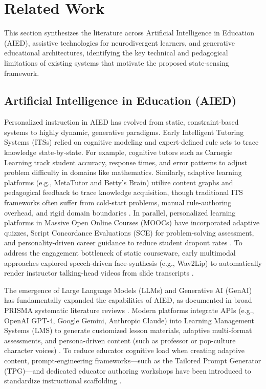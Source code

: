 \documentclass[final,5p,times,twocolumn,authoryear]{elsarticle}
\begin{document}
\section{Related Work}
\label{sec:related_work}

This section synthesizes the literature across Artificial Intelligence in Education (AIED), assistive technologies for neurodivergent learners, and generative educational architectures, identifying the key technical and pedagogical limitations of existing systems that motivate the proposed state-sensing framework.

\subsection{Artificial Intelligence in Education (AIED)}
\label{subsec:related_aied}

Personalized instruction in AIED has evolved from static, constraint-based systems to highly dynamic, generative paradigms. Early Intelligent Tutoring Systems (ITSs) relied on cognitive modeling and expert-defined rule sets to trace knowledge state-by-state. For example, cognitive tutors such as Carnegie Learning \cite{8} track student accuracy, response times, and error patterns to adjust problem difficulty in domains like mathematics. Similarly, adaptive learning platforms (e.g., MetaTutor and Betty's Brain) \cite{2} utilize content graphs and pedagogical feedback to trace knowledge acquisition, though traditional ITS frameworks often suffer from cold-start problems, manual rule-authoring overhead, and rigid domain boundaries \cite{3, 20}. In parallel, personalized learning platforms in Massive Open Online Courses (MOOCs) have incorporated adaptive quizzes, Script Concordance Evaluations (SCE) for problem-solving assessment, and personality-driven career guidance to reduce student dropout rates \cite{5}. To address the engagement bottleneck of static courseware, early multimodal approaches explored speech-driven face-synthesis (e.g., Wav2Lip) to automatically render instructor talking-head videos from slide transcripts \cite{19}.

The emergence of Large Language Models (LLMs) and Generative AI (GenAI) has fundamentally expanded the capabilities of AIED, as documented in broad PRISMA systematic literature reviews \cite{12, 18}. Modern platforms integrate APIs (e.g., OpenAI GPT-4, Google Gemini, Anthropic Claude) into Learning Management Systems (LMS) to generate customized lesson materials, adaptive multi-format assessments, and persona-driven content (such as professor or pop-culture character voices) \cite{4, 6, 10}. To reduce educator cognitive load when creating adaptive content, prompt-engineering frameworks—such as the Tailored Prompt Generator (TPG)—and dedicated educator authoring workshops have been introduced to standardize instructional scaffolding \cite{11, 14}.
\end{document}
